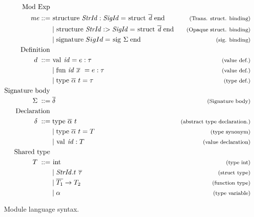\begin{figure}[!htb]
\begin{align*}
\begin{aligned}
%
\text{Mod Exp }\\
\mathit{me} ::= \; & \text{\lsttext{structure}} \;  \mathit{StrId : SigId} = \text{\lsttext{struct}}\; \overline{\mathit{d}}\; \text{\lsttext{end}}
                                             & \expl{(Trans. struct. binding)}\\
&|\; \text{\lsttext{structure}} \;  \mathit{StrId :> SigId} = 
\text{\lsttext{struct}}\; \overline{\mathit{d}}\; \text{\lsttext{end}}
                                             & \expl{(Opaque struct. binding)}\\
&|\; \text{\lsttext{signature}} \; SigId = 
\text{\lsttext{sig}}\; \Sigma \; \text{\lsttext{end}} 
                                             & \expl{(sig. binding)}\\
%
\text{Definition }\\
d \; ::= \; &\text{\lsttext{val}}\ \mathit{id}=e:\tau   & \expl{(value def.)} \\
& |\; \text{\lsttext{fun}}\  \mathit{id}\ \overline{x}\ =e:\tau   & \expl{(value def.)} \\
& |\; \text{\lsttext{type}}\ \ova\ t= \tau           & \expl{(type def.)} \\
%
\text{Signature body } \\
\Sigma \; ::= \; &\overline{\delta}                    & \expl{(Signature body)}\\
%
\text{Declaration }\\
\delta \; ::= \; & \text{\lsttext{type}}\ \ova\ t  & \expl{(abstract type declaration.)} \\
& | \; \text{\lsttext{type}}\ \ova\ t = T          & \expl{(type synonym)} \\
& | \; \text{\lsttext{val}}\ \mathit{id}:T         & \expl{(value declaration)} \\
%
\text{Shared type } \\
T \; ::= \; &\text{\lsttext{int}}                  & \expl{(type int)} \\
&| \; \mathit{StrId}.t \ \overline{\tau}           & \expl{(struct type)}\\
&| \; \overline{T_{1}} \rightarrow T_{2}           & \expl{(function type)}\\
&| \; \alpha                                       & \expl{(type variable)}
\end{aligned}
\end{align*}
\caption[Syntax: Module Language]{Module language syntax. \label{fig:ModuleSyntax}}
\label{fig:Syntax}
\end{figure}
